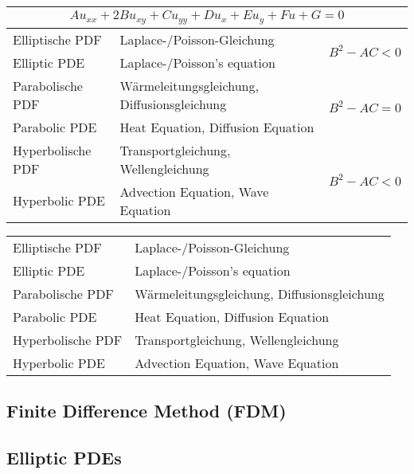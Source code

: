\documentclass[
	final,
	a4paper,
	oneside,
	parskip=full,
	headings=standardclasses,
	headings=big,
	pointednumbers,
    fleqn
]{scrartcl}
\begin{document}
    \begin{tabular}{lll}
        \multicolumn{3}{c}{$ Au_{xx} + 2Bu_{xy} + Cu_{yy} + Du_x + Eu_y + Fu +G= 0 $} \\
        \hline
        Elliptische PDF                 & Laplace-/Poisson-Gleichung    & \multirow{2}{*}{$ B^2 - AC < 0$} \\
        Elliptic PDE                    & Laplace-/Poisson's equation   & \\
        \hline
        Parabolische PDF                & Wärmeleitungsgleichung, Diffusionsgleichung   & \multirow{2}{*}{$ B^2 - AC = 0$} \\
        Parabolic PDE                   & Heat Equation, Diffusion Equation             & \\
        \hline
        Hyperbolische PDF               & Transportgleichung, Wellengleichung           & \multirow{2}{*}{$ B^2 - AC < 0 $} \\
        Hyperbolic PDE                  & Advection Equation, Wave Equation             &
    \end{tabular}

    \begin{tabular}{ll}
        \hline
        Elliptische PDF                 & Laplace-/Poisson-Gleichung                    \\
        Elliptic PDE                    & Laplace-/Poisson's equation                   \\
        \hline
        Parabolische PDF                & Wärmeleitungsgleichung, Diffusionsgleichung   \\
        Parabolic PDE                   & Heat Equation, Diffusion Equation             \\
        \hline
        Hyperbolische PDF               & Transportgleichung, Wellengleichung           \\
        Hyperbolic PDE                  & Advection Equation, Wave Equation             
    \end{tabular}


    \newpage

    \subsection*{Finite Difference Method (FDM)}
    \subsection*{Elliptic PDEs}
\end{document}
